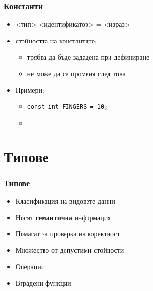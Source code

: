 \documentclass{beamer}
\begin{document}
\begin{frame}[fragile]
  \frametitle{Константи}
  \begin{itemize}[<+->]
  \item {} <тип> <идентификатор> \tta= <израз>\tta;
  \item стойността на константите:
    \begin{itemize}
    \item \alert{трябва} да бъде зададена при дефиниране
    \item \alert{не може} да се променя след това
    \end{itemize}
  \item Примери:
    \begin{itemize}
    \item \lstinline{const int FINGERS = 10;}
    \item {}
    \end{itemize}
  \end{itemize}
\end{frame}

\section{Типове}

\begin{frame}
  \frametitle{Типове}
  \begin{itemize}[<+->]
  \item Класификация на видовете данни
  \item Носят \textbf{семантична} информация
  \item Помагат за проверка на коректност
  \item Множество от допустими стойности
  \item Операции
  \item Вградени функции
  \end{itemize}
\end{frame}
\end{document}
